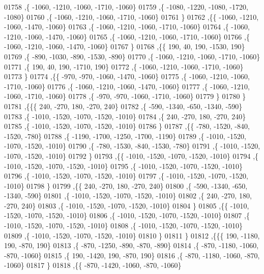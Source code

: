\begin{DoxyCode}
01758     ,\{ -1060, -1210, -1060, -1710, -1060\}
01759     ,\{ -1080, -1220, -1080, -1720, -1080\}
01760     ,\{ -1060, -1210, -1060, -1710, -1060\}
01761     \}
01762    ,\{\{ -1060, -1210, -1060, -1470, -1060\}
01763     ,\{ -1060, -1210, -1060, -1710, -1060\}
01764     ,\{ -1060, -1210, -1060, -1470, -1060\}
01765     ,\{ -1060, -1210, -1060, -1710, -1060\}
01766     ,\{ -1060, -1210, -1060, -1470, -1060\}
01767     \}
01768    ,\{\{   190,    40,   190, -1530,   190\}
01769     ,\{  -890, -1030,  -890, -1530,  -890\}
01770     ,\{ -1060, -1210, -1060, -1710, -1060\}
01771     ,\{   190,    40,   190, -1710,   190\}
01772     ,\{ -1060, -1210, -1060, -1710, -1060\}
01773     \}
01774    ,\{\{  -970,  -970, -1060, -1470, -1060\}
01775     ,\{ -1060, -1210, -1060, -1710, -1060\}
01776     ,\{ -1060, -1210, -1060, -1470, -1060\}
01777     ,\{ -1060, -1210, -1060, -1710, -1060\}
01778     ,\{  -970,  -970, -1060, -1710, -1060\}
01779     \}
01780    \}
01781   ,\{\{\{   240,  -270,   180,  -270,   240\}
01782     ,\{  -590, -1340,  -650, -1340,  -590\}
01783     ,\{ -1010, -1520, -1070, -1520, -1010\}
01784     ,\{   240,  -270,   180,  -270,   240\}
01785     ,\{ -1010, -1520, -1070, -1520, -1010\}
01786     \}
01787    ,\{\{  -780, -1520,  -840, -1520,  -780\}
01788     ,\{ -1190, -1700, -1250, -1700, -1190\}
01789     ,\{ -1010, -1520, -1070, -1520, -1010\}
01790     ,\{  -780, -1530,  -840, -1530,  -780\}
01791     ,\{ -1010, -1520, -1070, -1520, -1010\}
01792     \}
01793    ,\{\{ -1010, -1520, -1070, -1520, -1010\}
01794     ,\{ -1010, -1520, -1070, -1520, -1010\}
01795     ,\{ -1010, -1520, -1070, -1520, -1010\}
01796     ,\{ -1010, -1520, -1070, -1520, -1010\}
01797     ,\{ -1010, -1520, -1070, -1520, -1010\}
01798     \}
01799    ,\{\{   240,  -270,   180,  -270,   240\}
01800     ,\{  -590, -1340,  -650, -1340,  -590\}
01801     ,\{ -1010, -1520, -1070, -1520, -1010\}
01802     ,\{   240,  -270,   180,  -270,   240\}
01803     ,\{ -1010, -1520, -1070, -1520, -1010\}
01804     \}
01805    ,\{\{ -1010, -1520, -1070, -1520, -1010\}
01806     ,\{ -1010, -1520, -1070, -1520, -1010\}
01807     ,\{ -1010, -1520, -1070, -1520, -1010\}
01808     ,\{ -1010, -1520, -1070, -1520, -1010\}
01809     ,\{ -1010, -1520, -1070, -1520, -1010\}
01810     \}
01811    \}
01812   ,\{\{\{   190, -1180,   190,  -870,   190\}
01813     ,\{  -870, -1250,  -890,  -870,  -890\}
01814     ,\{  -870, -1180, -1060,  -870, -1060\}
01815     ,\{   190, -1420,   190,  -870,   190\}
01816     ,\{  -870, -1180, -1060,  -870, -1060\}
01817     \}
01818    ,\{\{  -870, -1420, -1060,  -870, -1060\}

\end{DoxyCode}
